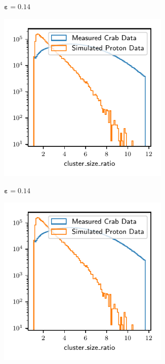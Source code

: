 \begin{figure}
  \begin{subfigure}{0.5\textwidth}
    \centering
    $\symbf{\varepsilon = 0.14}$\par\smallskip
    \includegraphics[width=0.9\textwidth, page=23]{Plots/Epsilon/14_comparison.pdf}
  \end{subfigure}
  \begin{subfigure}{0.5\textwidth}
    \centering
    $\symbf{\varepsilon = 0.14}$\par\smallskip
    \includegraphics[width=0.9\textwidth, page=2]{Plots/Epsilon/14_comparison.pdf}

\end{subfigure}
\end{figure}
